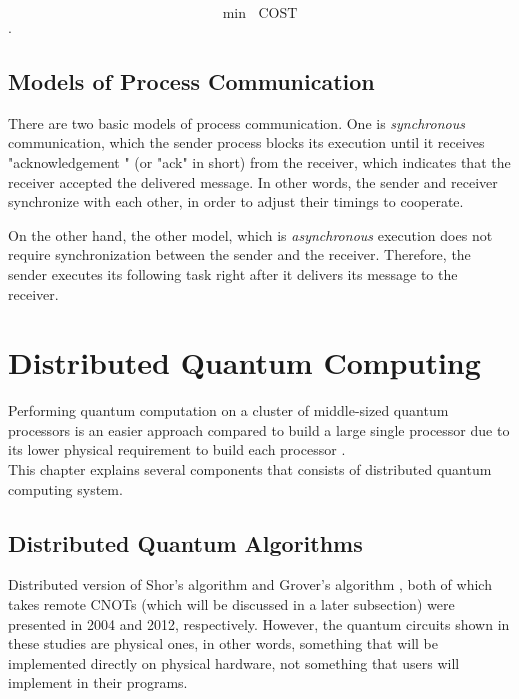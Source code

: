  \begin{equation}
 \operatorname{min} \,\,\operatorname{COST}
 \end{equation}.

\subsection{Models of Process Communication}

There are two basic models of process communication. One is \textit{synchronous} communication, which the sender process blocks its execution until it receives "acknowledgement " (or "ack" in short) from the receiver, which indicates that the receiver accepted the delivered message. In other words, the sender and receiver synchronize with each other, in order to adjust their timings to cooperate.
\par On the other hand, the other model, which is \textit{asynchronous} execution does not require synchronization between the sender and the receiver.  Therefore, the sender executes its following task right after it delivers its message to the receiver. 

\newpage

\section{Distributed Quantum Computing}
 
  Performing quantum computation on a cluster of middle-sized quantum processors is an easier approach compared to build a large single processor due to its lower physical requirement to build each processor \cite{distributedquantumcomputing}.  \\
This chapter explains several components that consists of distributed quantum computing system.

\subsection{Distributed Quantum Algorithms}

Distributed version of Shor's algorithm \cite{distributedshor} and Grover's algorithm \cite{distributedgrover}, both of which takes remote CNOTs (which will be discussed in a  later subsection) were presented in 2004 and 2012, respectively. 
However, the quantum circuits shown in these studies are physical ones, in other words, something that will be implemented directly on physical hardware, not something that users will implement in their programs. 

